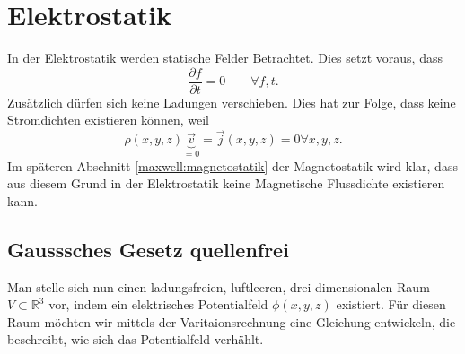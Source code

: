 %
%
%
%
\section{Elektrostatik\label{maxwell:section:elekktrostatik}}
In der Elektrostatik werden statische Felder Betrachtet.
Dies setzt voraus, dass
\begin{equation}
	\frac{\partial f}{\partial t}
	=
	0
	\qquad
	\forall f,t.
	\label{maxwell:section:definition_statik}
\end{equation}
Zusätzlich dürfen sich keine Ladungen verschieben.
Dies hat zur Folge, dass keine Stromdichten existieren können, weil
\begin{equation}
	\rho(x,y,z) \underbrace{\vec{v}}_{=0}
	=
	\vec{j}(x,y,z)
	=
	0
	\forall x,y,z.
\end{equation}
Im späteren Abschnitt \ref{maxwell:magnetostatik} der Magnetostatik wird klar, dass aus diesem Grund in der Elektrostatik keine Magnetische Flussdichte existieren kann.

\subsection{Gausssches Gesetz quellenfrei
	\label{maxwell:section:elektrostatik_ohne_quelle}}
Man stelle sich nun einen ladungsfreien, luftleeren, drei dimensionalen Raum $V\subset\mathbb{R}^3$
vor, indem ein elektrisches Potentialfeld $\phi(x,y,z)$ existiert.
Für diesen Raum möchten wir mittels der Varitaionsrechnung eine Gleichung entwickeln, die beschreibt, wie sich das Potentialfeld verhählt. 

